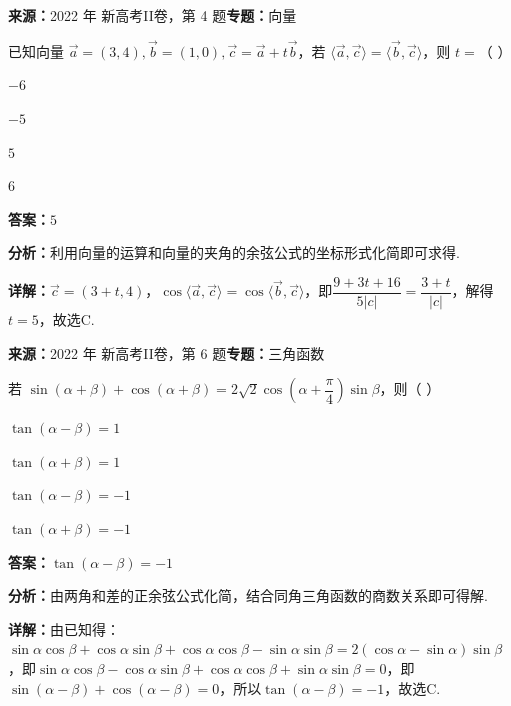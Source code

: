 \begin{question}[points=5]
\textbf{来源：}2022 年 新高考II卷，第 4 题\quad \textbf{专题：}向量\par
已知向量 $\vec{a}=(3,4),\vec{b}=(1,0),\vec{c}=\vec{a}+t\vec{b}$，若 $\langle\vec{a},\vec{c}\rangle=\langle\vec{b},\vec{c}\rangle$，则 $t=$（ ）
\begin{choices}
  \item $-6$
  \item $-5$
  \item $5$
  \item $6$
\end{choices}
\begin{solution}
\textbf{答案：}$5$

\textbf{分析：}利用向量的运算和向量的夹角的余弦公式的坐标形式化简即可求得.

\textbf{详解：}$\vec{c}=(3+t,4)$，$\cos\langle\vec{a},\vec{c}\rangle=\cos\langle\vec{b},\vec{c}\rangle$，即$\dfrac{9+3t+16}{5|c|}=\dfrac{3+t}{|c|}$，解得$t=5$，故选C.
\end{solution}
\end{question}

\begin{question}[points=5]
\textbf{来源：}2022 年 新高考II卷，第 6 题\quad \textbf{专题：}三角函数\par
若 $\sin(\alpha+\beta)+\cos(\alpha+\beta)=2\sqrt{2}\cos\left(\alpha+\dfrac{\pi}{4}\right)\sin\beta$，则（ ）
\begin{choices}
  \item $\tan(\alpha-\beta)=1$
  \item $\tan(\alpha+\beta)=1$
  \item $\tan(\alpha-\beta)=-1$
  \item $\tan(\alpha+\beta)=-1$
\end{choices}
\begin{solution}
\textbf{答案：}$\tan(\alpha-\beta)=-1$

\textbf{分析：}由两角和差的正余弦公式化简，结合同角三角函数的商数关系即可得解.

\textbf{详解：}由已知得：$\sin\alpha\cos\beta+\cos\alpha\sin\beta+\cos\alpha\cos\beta-\sin\alpha\sin\beta=2(\cos\alpha-\sin\alpha)\sin\beta$，即$\sin\alpha\cos\beta-\cos\alpha\sin\beta+\cos\alpha\cos\beta+\sin\alpha\sin\beta=0$，即$\sin(\alpha-\beta)+\cos(\alpha-\beta)=0$，所以$\tan(\alpha-\beta)=-1$，故选C.
\end{solution}
\end{question}

